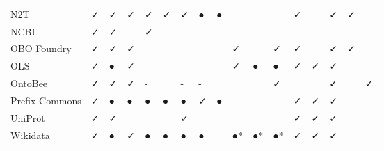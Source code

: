 \begin{table}
\begin{tabular}{lllllllllllllllll}
            N2T &              ✓ &        ✓ &     ✓ &          ✓ &          ✓ &        ✓ &              ● &             ● &         &         &         &                          ✓ &        &               ✓ &        ✓ &        \\
           NCBI &              ✓ &        ✓ &       &          ✓ &            &          &                &               &         &         &         &                            &        &                 &          &        \\
    OBO Foundry &              ✓ &        ✓ &     ✓ &            &            &          &                &               &       ✓ &         &       ✓ &                          ✓ &        &               ✓ &        ✓ &        \\
            OLS &              ✓ &        ● &     ✓ &          - &            &        - &              - &               &       ✓ &       ● &       ● &                          ✓ &      ✓ &               ✓ &          &        \\
        OntoBee &              ✓ &        ✓ &     ✓ &          - &            &        - &              - &               &         &         &       ✓ &                            &        &               ✓ &          &      ✓ \\
 Prefix Commons &              ✓ &        ● &     ● &          ● &          ● &        ● &              ✓ &             ● &         &         &         &                          ✓ &      ✓ &               ✓ &          &        \\
        UniProt &              ✓ &        ✓ &       &            &            &        ✓ &                &               &         &         &         &                          ✓ &      ✓ &               ✓ &          &        \\
       Wikidata &              ✓ &        ● &     ✓ &          ● &          ● &        ● &              ● &               &      ●* &      ●* &      ●* &                          ✓ &      ✓ &               ✓ &          &        \\
\bottomrule
\end{tabular}
\end{table}
